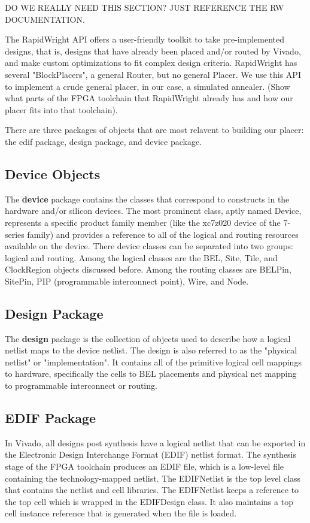 \documentclass[twocolumn]{article}
\begin{document}
    DO WE REALLY NEED THIS SECTION? JUST REFERENCE THE RW DOCUMENTATION.

    The RapidWright API offers a user-friendly toolkit to take pre-implemented designs, that is, designs that have already been placed and/or routed by Vivado, and make custom optimizations to fit complex design criteria. 
    RapidWright has several "BlockPlacers", a general Router, but no general Placer. 
    We use this API to implement a crude general placer, in our case, a simulated annealer. 
    (Show what parts of the FPGA toolchain that RapidWright already has and how our placer fits into that toolchain). 

    There are three packages of objects that are most relavent to building our placer: the edif package, design package, and device package. 

    \subsection{Device Objects}
    The \textbf{device} package contains the classes that correspond to constructs in the hardware and/or silicon devices. 
    The most prominent class, aptly named Device, represents a specific product family member (like the xc7z020 device of the 7-series family) and provides a reference to all of the logical and routing resources available on the device. 
    There device classes can be separated into two groups: logical and routing. 
    Among the logical classes are the BEL, Site, Tile, and ClockRegion objects discussed before. 
    Among the routing classes are BELPin, SitePin, PIP (programmable interconnect point), Wire, and Node. 

    \subsection{Design Package}
    The \textbf{design} package is the collection of objects used to describe how a logical netlist maps to the device netlist. 
    The design is also referred to as the "physical netlist" or "implementation". 
    It contains all of the primitive logical cell mappings to hardware, specifically the cells to BEL placements and physical net mapping to programmable interconnect or routing. 

    \subsection{EDIF Package}
    In Vivado, all designs post synthesis have a logical netlist that can be exported in the Electronic Design Interchange Format (EDIF) netlist format. 
    The synthesis stage of the FPGA toolchain produces an EDIF file, which is a low-level file containing the technology-mapped netlist. 
    The EDIFNetlist is the top level class that contains the netlist and cell libraries. 
    The EDIFNetlist keeps a reference to the top cell which is wrapped in the EDIFDesign class. 
    It also maintains a top cell instance reference that is generated when the file is loaded. 
\end{document}
